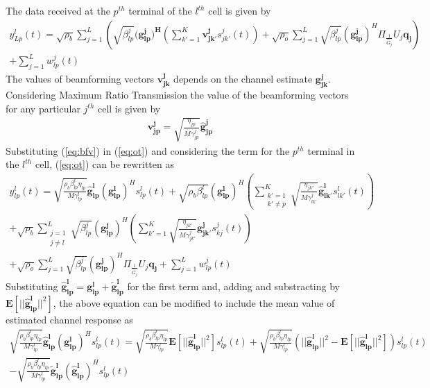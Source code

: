 \documentclass[10pt, a4paper, twoside,fleqn]{article}
\begin{document}
The data received at the $p^{th}$ terminal of the $l^{th}$ cell is given by
\begin{eqnarray}\label{eq:ot}
 	y_{Lp}^{l}(t) = \sqrt{\rho_b}\sum_{j=1}^{L} \left(\sqrt{\beta_{lp}^{j}} (\mathbf{g_{lp}^{j})^H} \left(\sum_{k'=1}^{K}\mathbf{v_{jk'}^{j}}s_{jk'}^{j}(t)\right)
 		      + \sqrt{\rho_o}\sum_{j=1}^{L}\sqrt{\beta_{lp}^{j}}(\mathbf{g_{lp}^{j}})^H \Pi_{\frac{1}{\hat G_j}} U_j \mathbf{q_{j}}\right) \nonumber \\
 		      + \sum_{j=1}^{L} w_{lp}^{j}(t)
\end{eqnarray}  
The values of beamforming vectors $\mathbf{v_{jk}^{j}}$ depends on the channel estimate $\mathbf{g_{jk}^{j}}$. Considering Maximum Ratio Transmission the value of the beamforming vectors for any particular $j^{th}$ cell is given by
\begin{eqnarray}\label{eq:bfv}
	\mathbf{v_{jp}^{j}} = \sqrt{\frac{\eta_{jp}}{M\gamma_{jp}^{j}}}\mathbf{\hat g_{jp}^{j}}
\end{eqnarray}
Substituting (\ref{eq:bfv}) in (\ref{eq:ot}) and considering the term for the $p^{th}$ terminal in the $l^{th}$ cell, (\ref{eq:ot}) can be rewritten as
\begin{eqnarray}\label{eqn:completeot}
    y_{lp}^{l}(t) = \sqrt{\frac{\rho_b\beta_{lp}^{l}\eta_{lp}}{M\gamma_{lp}^{l}}}\mathbf{\hat g_{lp}^{l}} (\mathbf{g_{lp}^{l}})^H  s_{lp}^{l}(t)
                  + \sqrt{\rho_b\beta_{lp}^{l}} (\mathbf{g_{lp}^{l}})^H \left(\sum_{\substack{k'=1 \\ k' \neq p}}^{K} \sqrt{\frac{\eta_{jk'}}{M\gamma_{lk'}^{j}}}\mathbf{\hat g_{lk'}^{l}}s_{lk'}^{l} (t)\right) \nonumber \\
		  + \sqrt{\rho_b} \sum_{\substack{j=1 \\ j \neq l}}^{L}\sqrt{\beta_{lp}^{j}} (\mathbf{g_{lp}^{j}})^H \left(\sum_{k'=1}^{K} \sqrt{\frac{\eta_{jk'}}{M\gamma_{jk'}^{j}}}\mathbf{g_{jk'}^{j}}s_{kj}^{j} (t)\right) \nonumber \\
		  + \sqrt{\rho_o}\sum_{j=1}^{L}\sqrt{\beta_{lp}^{j}}(\mathbf{g_{lp}^{j}})^H \Pi_{\frac{1}{\hat G_j}} U_j \mathbf{q_{j}} 
    	  	  + \sum_{j=1}^{L} w_{lp}^{j}(t)
\end{eqnarray}
Substituting $\mathbf{\hat g_{lp}^{l}} = \mathbf{g_{lp}^{l}} + {\mathbf{\widetilde{g}_{lp}^{l}}}$ for the first term and, adding and substracting by $\mathbf{E}[||\mathbf{\hat g_{lp}^{l}}||^2]$, the above equation can be modified to include the mean value of estimated channel response as
\begin{eqnarray} \label{eqn:otsig}
	\sqrt{\frac{\rho_b\beta_{lp}^{l}\eta_{lp}}{M\gamma_{lp}^{l}}}\mathbf{\hat g_{lp}^{l}} (\mathbf{g_{lp}^{l}})^H  s_{lp}^{l}(t)
	           =  \sqrt{\frac{\rho_b\beta_{lp}^{l}\eta_{lp}}{M\gamma_{lp}^{l}}}\mathbf{E}[||\mathbf{\hat g_{lp}^{l}}||^2]s_{lp}^{l}(t)
	           +  \sqrt{\frac{\rho_b\beta_{lp}^{l}\eta_{lp}}{M\gamma_{lp}^{l}}}\left(||\mathbf{\hat g_{lp}^{l}}||^2 - \mathbf{E}[||\mathbf{\hat g_{lp}^{l}}||^2]\right)s_{lp}^{l}(t) \nonumber \\
	           -   \sqrt{\frac{\rho_b\beta_{lp}^{l}\eta_{lp}}{M\gamma_{lp}^{l}}}\mathbf{\widetilde{g}_{lp}^{l}} (\mathbf{\hat g_{lp}^{l}})^H  s_{lp}^{l}(t)
\end{eqnarray}
\end{document}
